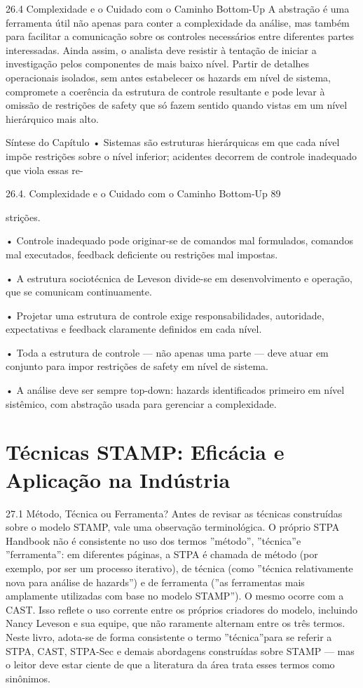 26.4 Complexidade e o Cuidado com o Caminho Bottom-Up A abstração é uma ferramenta útil não apenas para conter a complexidade da análise, mas também para facilitar a comunicação sobre os controles necessários entre diferentes partes interessadas. Ainda assim, o analista deve resistir à tentação de iniciar a investigação pelos componentes de mais baixo nível. Partir de detalhes operacionais isolados, sem antes estabelecer os hazards em nível de sistema, compromete a coerência da estrutura de controle resultante e pode levar à omissão de restrições de safety que só fazem sentido quando vistas em um nível hierárquico mais alto.

Síntese do Capítulo • Sistemas são estruturas hierárquicas em que cada nível impõe restrições sobre o nível inferior; acidentes decorrem de controle inadequado que viola essas re-

26.4. Complexidade e o Cuidado com o Caminho Bottom-Up 89

strições.

• Controle inadequado pode originar-se de comandos mal formulados, comandos mal executados, feedback deficiente ou restrições mal impostas.

• A estrutura sociotécnica de Leveson divide-se em desenvolvimento e operação, que se comunicam continuamente.

• Projetar uma estrutura de controle exige responsabilidades, autoridade, expectativas e feedback claramente definidos em cada nível.

• Toda a estrutura de controle — não apenas uma parte — deve atuar em conjunto para impor restrições de safety em nível de sistema.

• A análise deve ser sempre top-down: hazards identificados primeiro em nível sistêmico, com abstração usada para gerenciar a complexidade.

\chapter{Técnicas STAMP: Eficácia e Aplicação na Indústria}

27.1 Método, Técnica ou Ferramenta? Antes de revisar as técnicas construídas sobre o modelo STAMP, vale uma observação terminológica. O próprio STPA Handbook não é consistente no uso dos termos ”método”, ”técnica”e ”ferramenta”: em diferentes páginas, a STPA é chamada de método (por exemplo, por ser um processo iterativo), de técnica (como ”técnica relativamente nova para análise de hazards”) e de ferramenta (”as ferramentas mais amplamente utilizadas com base no modelo STAMP”). O mesmo ocorre com a CAST. Isso reflete o uso corrente entre os próprios criadores do modelo, incluindo Nancy Leveson e sua equipe, que não raramente alternam entre os três termos. Neste livro, adota-se de forma consistente o termo ”técnica”para se referir a STPA, CAST, STPA-Sec e demais abordagens construídas sobre STAMP — mas o leitor deve estar ciente de que a literatura da área trata esses termos como sinônimos.

